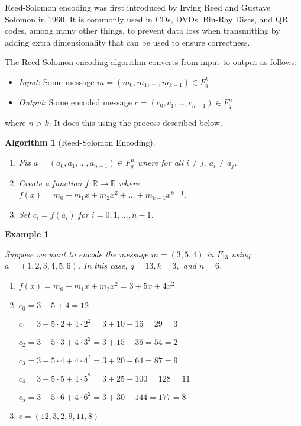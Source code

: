 \documentclass{article}
\newtheorem{algorithm}[theorem]{Algorithm}
\newtheorem{example}[theorem]{Example}
\begin{document}
Reed-Solomon encoding was first introduced by Irving Reed and Gustave Solomon in 1960. It is commonly used in CDs, DVDs, Blu-Ray Discs, and QR codes, among many other things, to prevent data loss when transmitting by adding extra dimensionality that can be used to ensure correctness.

The Reed-Solomon encoding algorithm converts from input to output as follows:
\begin{itemize}
    \item \textit{Input}: Some message $m=(m_0,m_1,\dots,m_{k-1})\in F_q^k$
    \item \textit{Output}: Some encoded message $c=(c_0,c_1,\dots,c_{n-1})\in F_q^n$
\end{itemize}
where $n>k$. It does this using the process described below.

\begin{algorithm}[Reed-Solomon Encoding]\

\begin{enumerate}
    \item Fix $a=(a_0,a_1,\dots,a_{n-1})\in F_q^n$ where for all $i\neq j$, $a_i \neq a_j$.
    \item Create a function $f:\mathbb{R}\rightarrow \mathbb{R}$ where $f(x)=m_0+m_1 x + m_2x^2 + \dots + m_{k-1}x^{k-1}$.
    \item Set $c_i=f(a_i)$ for $i=0,1,\dots,n-1$.
\end{enumerate}
\end{algorithm}

\begin{example}\

Suppose we want to encode the message $m=(3,5,4)$ in $F_{13}$ using $a=(1,2,3,4,5,6)$. In this case, $q=13, k=3,$ and $n=6$.
\begin{enumerate}
\item $f(x)=m_0+m_1 x + m_2x^2=3+5x+4x^2$
\item $c_0=3+5+4=12$

$c_1=3+5\cdot 2 + 4\cdot 2^2=3+10+16=29=3$

$c_2=3+5\cdot3+4\cdot3^2=3+15+36=54=2$

$c_3=3+5\cdot4+4\cdot4^2=3+20+64=87=9$

$c_4=3+5\cdot5+4\cdot5^2=3+25+100=128=11$

$c_5=3+5\cdot6+4\cdot6^2=3+30+144=177=8$
\item $c=(12,3,2,9,11,8)$
\end{enumerate}
\end{example}
\end{document}
